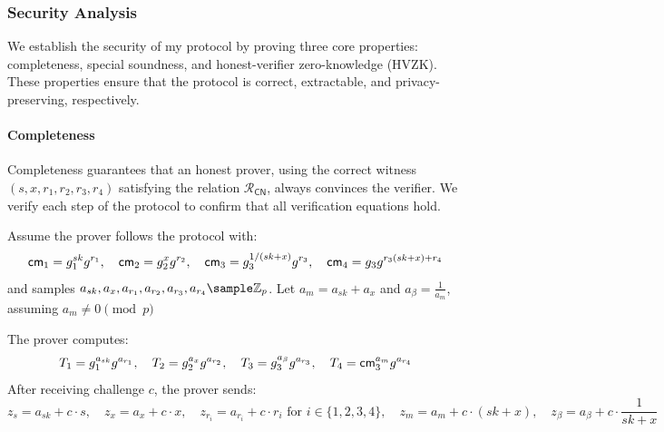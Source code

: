 \subsubsection{Security Analysis}
We establish the security of my protocol by proving three core properties: completeness, special soundness, and honest-verifier zero-knowledge (HVZK). These properties ensure that the protocol is correct, extractable, and privacy-preserving, respectively.

\paragraph{Completeness}
Completeness guarantees that an honest prover, using the correct witness $(s, x, r_1, r_2, r_3, r_4)$ satisfying the relation $\mathcal{R}_{\mathsf{CN}}$, always convinces the verifier. We verify each step of the protocol to confirm that all verification equations hold.

Assume the prover follows the protocol with:
\[
\mathsf{cm}_1 = g_1^{sk} g^{r_1}, \quad \mathsf{cm}_2 = g_2^{x} g^{r_2}, \quad \mathsf{cm}_3 = g_3^{1/(sk + x)} g^{r_3}, \quad \mathsf{cm}_4 = g_3 g^{r_3 (sk + x) + r_4}
\]
and samples $a_{sk}, a_x, a_{r_1}, a_{r_2}, a_{r_3}, a_{r_4} \sample \mathbb{Z}_p$. Let $a_m = a_{sk} + a_x$ and $a_{\beta} = \frac{1}{a_m}$, assuming $a_m \neq 0 \pmod{p}$


The prover computes:
\[
T_1 = g_1^{a_{sk}} g^{a_{r_1}}, \quad T_2 = g_2^{a_x} g^{a_{r_2}}, \quad T_3 = g_3^{a_{\beta}} g^{a_{r_3}}, \quad T_4 = \mathsf{cm}_3^{a_m} g^{a_{r_4}}
\]
After receiving challenge $c$, the prover sends:
\[
z_{s} = a_{sk} + c \cdot s, \quad z_x = a_x + c \cdot x, \quad z_{r_i} = a_{r_i} + c \cdot r_i \text{ for } i \in \{1,2,3,4\}, \quad z_m = a_m + c \cdot (sk + x), \quad z_{\beta} = a_{\beta} + c \cdot \frac{1}{sk + x}
\]

